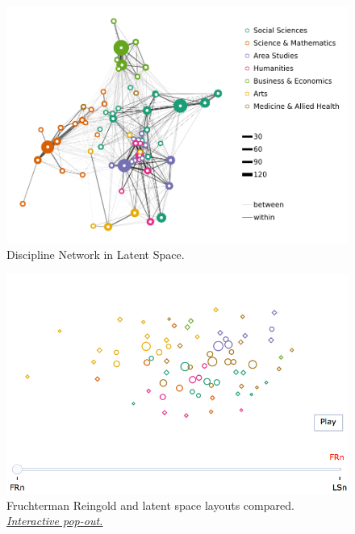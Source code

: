 \documentclass[]{book}
\theoremstyle{definition}
\theoremstyle{definition}
\theoremstyle{definition}
\theoremstyle{remark}
\begin{document}
\begin{figure}

{\centering \includegraphics[width=0.9\linewidth]{02_files/figure-latex/jclu-lnet-1} 

}

\caption{Discipline Network in Latent Space.}\label{fig:jclu-lnet}
\end{figure}





\begin{figure}

{\centering \includegraphics[width=0.9\linewidth]{img/layouts} 

}

\caption{Fruchterman Reingold and latent space layouts compared.
\href{https://brooksambrose.github.io/portfolio/exh/layouts.html}{\emph{Interactive
pop-out.}}}\label{fig:layouts}
\end{figure}
\end{document}
